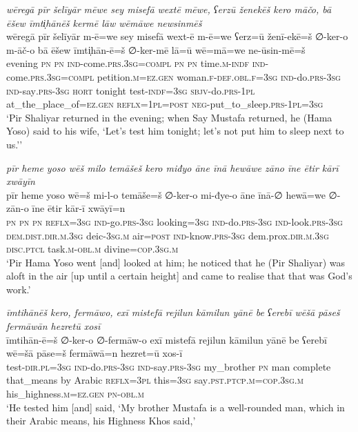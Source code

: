 \ea \label{ŽP.62}
\textit{wēregā pīr šelīyār mēwe sey misefā wextē mēwe, ʕerzū ženekēš kero māčo, bā ēšew īmti̩hānēš kermē lāw wēmāwe newsinmēš} \\ 
\gll wēregā pīr šelīyār m-ē=we sey misefā wext-ē m-ē=we ʕerz=ū ženī-ekē=š ∅-ker-o m-āč-o bā ēšew īmti̩hān-ē=š ∅-ker-mē lā=ū wē=mā=we ne-ūsin-mē=š \\ 
 evening \textsc{pn} \textsc{pn} \textsc{ind-}come\textsc{.prs}\textsc{.3sg}\textsc{=compl} \textsc{pn} \textsc{pn} time\textsc{.m}\textsc{-indf} \textsc{ind-}come\textsc{.prs}\textsc{.3sg}\textsc{=compl} petition\textsc{.m}\textsc{\textsc{=ez.gen}} woman\textsc{.f}\textsc{-def}\textsc{.obl}\textsc{.f}\textsc{=3sg} \textsc{ind-}do\textsc{.prs}\textsc{-3sg} \textsc{ind-}say\textsc{.prs}\textsc{-3sg} \textsc{hort} tonight test\textsc{-indf}\textsc{=3sg} \textsc{sbjv-}do\textsc{.prs}\textsc{-1pl} at\_the\_place\_of\textsc{\textsc{=ez.gen}} \textsc{reflx}\textsc{=1pl}\textsc{=\textsc{post}} \textsc{neg-}put\_to\_sleep\textsc{.prs}\textsc{-1pl}\textsc{=3sg} \\ 
\glt `Pir Shaliyar returned in the evening; when Say Mustafa returned, he (Hama Yoso) said to his wife, ‘Let’s test him tonight; let’s not put him to sleep next to us.’'
\z 
 
\ea \label{ŽP.71}
\textit{pīr heme yoso wēš milo temāšeš kero miđyo āne īnā hewāwe zāno īne ētir kārī xwāyīn} \\ 
\gll pīr heme yoso wē=š mi-l-o temāše=š ∅-ker-o mi-đye-o āne īnā-∅ hewā=we ∅-zān-o īne ētir kār-ī xwāyī=n \\ 
 \textsc{pn} \textsc{pn} \textsc{pn} \textsc{reflx}\textsc{=3sg} \textsc{ind-}go\textsc{.prs}\textsc{-3sg} looking\textsc{=3sg} \textsc{ind-}do\textsc{.prs}\textsc{-3sg} \textsc{ind-}look\textsc{.prs}\textsc{-3sg} \textsc{dem.dist}\textsc{.dir}\textsc{.m}\textsc{.3sg} deic\textsc{-3sg}\textsc{.m} air\textsc{=\textsc{post}} \textsc{ind-}know\textsc{.prs}\textsc{-3sg} dem.prox\textsc{.dir}\textsc{.m}\textsc{.3sg} \textsc{disc.ptcl} task\textsc{.m}\textsc{-obl}\textsc{.m} divine\textsc{=cop}\textsc{.3sg}\textsc{.m} \\ 
\glt `Pir Hama Yoso went [and] looked at him; he noticed that he (Pir Shaliyar) was aloft in the air [up until a certain height] and came to realise that that was God’s work.'
\z 
 
\ea \label{ŽP.83}
\textit{īmtihānēš kero, fermāwo, exī mistefā rejilun kāmilun yānē be ʕerebī wēšā pāseš fermāwān hezretū xosī} \\ 
\gll īmtihān-ē=š ∅-ker-o ∅-fermāw-o exī mistefā rejilun kāmilun yānē be ʕerebī wē=šā pāse=š fermāwā=n hezret=ū xos-ī \\ 
 test\textsc{-dir}\textsc{.pl}\textsc{=3sg} \textsc{ind-}do\textsc{.prs}\textsc{-3sg} \textsc{ind-}say\textsc{.prs}\textsc{-3sg} my\_brother \textsc{pn} man complete that\_means by Arabic \textsc{reflx}\textsc{=3pl} this\textsc{=3sg} say\textsc{.pst}\textsc{.ptcp}\textsc{.m}\textsc{=cop}\textsc{.3sg}\textsc{.m} his\_highness\textsc{.m}\textsc{\textsc{=ez.gen}} \textsc{pn}\textsc{-obl}\textsc{.m} \\ 
\glt `He tested him [and] said, ‘My brother Mustafa is a well-rounded man, which in their Arabic means, his Highness Khos said,'
\z 
 
